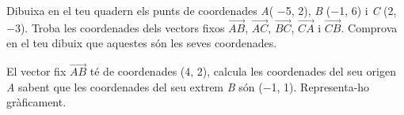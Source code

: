 \begin{mylist}
\exer  Dibuixa en el teu quadern els punts de coordenades \textit{A}(  $-$5, 2), \textit{B} ($-$1, 6) i \textit{C} (2, $-$3). Troba les coordenades dels vectors fixos $\overrightarrow{AB}$, $\overrightarrow{AC}$, $\overrightarrow{BC}$, $\overrightarrow{CA}$ i $\overrightarrow{CB}$. Comprova en el teu dibuix que aquestes són les seves coordenades.
 
\exer  El vector fix $\overrightarrow{AB}$ té de coordenades (4, 2), calcula les coordenades del seu origen \textit{A} sabent que les coordenades del seu extrem \textit{B} són ($-$1, 1). Representa-ho gràficament.


\end{mylist}
